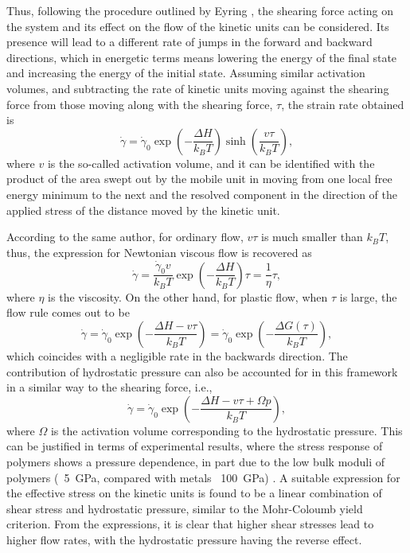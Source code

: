 Thus, following the procedure outlined by Eyring \citep{eyringViscosityPlasticityDiffusion1936}, the shearing force acting on the system and its effect on the flow of the kinetic units can be considered.
Its presence will lead to a different rate of jumps in the forward and backward directions, which in energetic terms means lowering the energy of the final state and increasing the energy of the initial state.
Assuming similar activation volumes, and subtracting the rate of kinetic units moving against the shearing force from those moving along with the shearing force, $\tau$, the strain rate obtained is
\begin{equation}
	\label{eq:eyring_model}
	\dot \gamma = \dot\gamma_0 \exp\left(-\frac{\Delta H}{k_BT}\right)\sinh\left(\frac{v\tau}{k_BT}\right),
\end{equation}
where $v$ is the so-called activation volume, and it can be identified with the product of the area swept out by the mobile unit in moving from one local free energy minimum to the next and the resolved component in the direction of the applied stress of the distance moved by the kinetic unit.

According to the same author, for ordinary flow, $v\tau$ is much smaller than $k_B T$, thus, the expression for Newtonian viscous flow is recovered as
\begin{equation}
  \label{eq:newton_fluid_flow_rule_scalar}
	\dot \gamma = \frac{\dot \gamma_0 v}{k_B T}\exp\left(-\frac{\Delta H}{k_BT}\right)\tau=\frac{1}{\eta}\tau,
\end{equation}
where $\eta$ is the viscosity.
On the other hand, for plastic flow, when $\tau$ is large, the flow rule comes out to be
\begin{equation}
\label{eq:flow_rule_thermally_activated}
	\dot\gamma = \dot \gamma_0 \exp\left(-\frac{\Delta H - v \tau}{k_B T}\right)=\dot \gamma_0 \exp\left(-\frac{\Delta G(\tau)}{k_B T}\right),
\end{equation}
which coincides with a negligible rate in the backwards direction.
The contribution of hydrostatic pressure can also be accounted for in this framework in a similar way to the shearing force, i.e.,
\begin{equation}
	\dot\gamma = \dot\gamma_0 \exp\left(-\frac{\Delta H - v \tau + \Omega p}{k_B T}\right),
\end{equation}
where $\Omega$ is the activation volume corresponding to the hydrostatic pressure.
This can be justified in terms of experimental results, where the stress response of polymers shows a pressure dependence, in part due to the low bulk moduli of polymers (~\SI{5}{\giga\pascal}, compared with metals ~\SI{100}{\giga\pascal}) \citep{wardIntroductionMechanicalProperties2004}.
A suitable expression for the effective stress on the kinetic units is found to be a linear combination of shear stress and hydrostatic pressure, similar to the Mohr-Coloumb yield criterion.
From the expressions, it is clear that higher shear stresses lead to higher flow rates, with the hydrostatic pressure having the reverse effect.

